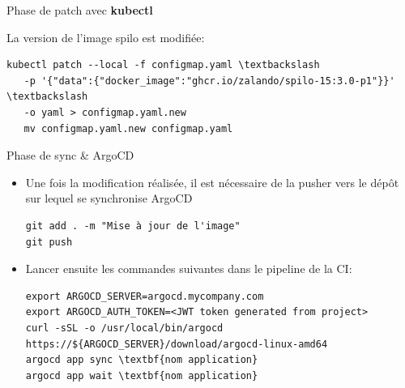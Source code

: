 
\begin{frame}[fragile]{Phase de patch avec \textbf{kubectl}}

   La version de l'image spilo est modifiée:
\begin{itemize}
\begin{tiny}
\begin{Verbatim}[commandchars=\\\{\}]
   kubectl patch --local -f configmap.yaml \textbackslash
   -p '{"data":{"docker_image":"ghcr.io/zalando/spilo-15:3.0-p1"}}' \textbackslash
   -o yaml > configmap.yaml.new
   mv configmap.yaml.new configmap.yaml
\end{Verbatim}
\end{tiny}
\end{itemize}

\end{frame}


\begin{frame}[fragile]{Phase de sync \& ArgoCD}

\begin{itemize}
   \item Une fois la modification réalisée, il est nécessaire de la pusher vers le dépôt sur lequel se synchronise ArgoCD
\begin{tiny}
\begin{Verbatim}[commandchars=\&\{\}]
git add . -m "Mise à jour de l'image"
git push
\end{Verbatim}
\end{tiny}
   \item Lancer ensuite les commandes suivantes dans le pipeline de la CI:
\begin{tiny}
\begin{Verbatim}[commandchars=\\\{\}]
export ARGOCD_SERVER=argocd.mycompany.com
export ARGOCD_AUTH_TOKEN=<JWT token generated from project>
curl -sSL -o /usr/local/bin/argocd https://${ARGOCD_SERVER}/download/argocd-linux-amd64
argocd app sync \textbf{nom application}
argocd app wait \textbf{nom application}
\end{Verbatim}
\end{tiny}
\end{itemize}

\end{frame}

